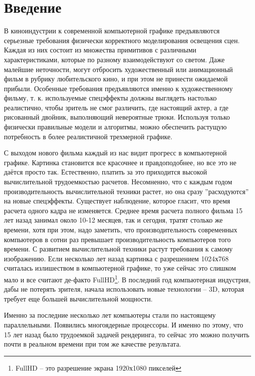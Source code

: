 \documentclass[12pt, a4paper, utf8]{article}
\begin{document}
\tableofcontents

\newpage
\section*{Введение}
В киноиндустрии к современной компьютерной графике предъявляются серьезные требования физически корректного моделирования освещения сцен. Каждая из них состоит из множества примитивов с различными характеристиками, которые по разному взаимодействуют со светом. Даже малейшие неточности, могут отбросить художественный или анимационный фильм в рубрику любительского кино, и при этом не принести ожидаемой прибыли. Особенные требования предъявляются именно к художественному фильму, т. к. используемые спецэффекты должны выглядеть настолько реалистично, чтобы зритель не смог различить, где настоящий актер, а где рисованный двойник, выполняющий невероятные трюки. Используя только физически правильные модели и алгоритмы, можно обеспечить растущую потребность в более реалистичной трехмерной графике.

   С выходом нового фильма каждый из нас видит прогресс в компьютерной графике. Картинка становится все красочнее и правдоподобнее, но все это не даётся просто так. Естественно, платить за это приходится высокой вычислительной трудоемкостью расчетов. Несомненно, что с каждым годом производительность вычислительной техники растет, но она сразу ''расходуются'' на новые спецэффекты. Существует наблюдение, которое гласит, что время расчета одного кадра не изменяется. Среднее время расчета полного фильма 15 лет назад занимал около 10-12 месяцев, так и сегодня, тратят столько же времени, хотя при этом, надо заметить, что производительность современных компьютеров в сотни раз превышает производительность компьютеров того времени. С развитием вычислительной техники растут требования к самому изображению. Если несколько лет назад картинка с разрешением 1024х768 считалась излишеством в компьютерной графике, то уже сейчас это слишком мало и все считают де-факто FullHD\footnote{ FullHD -- это разрешение экрана 1920х1080 пикселей}. В последний год компьютерная индустрия, дабы не потерять зрителя, начала использовать новые технологии -- 3D, которая требует еще большей вычислительной мощности. 

   Именно за последние несколько лет компьютеры стали по настоящему параллельными. Появились многоядерные процессоры. И именно по этому, что 15 лет назад было трудоемкой задачей рендеринга, то сейчас это можно получить почти в реальном времени при том же качестве результата.
\end{document}
